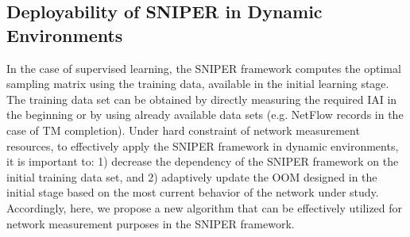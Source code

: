 %
%

\subsection{Deployability of SNIPER in Dynamic Environments}
In the case of supervised learning, the SNIPER framework computes the optimal sampling matrix using the training data, available in the initial learning stage. The training data set can be obtained by directly measuring the required IAI in the beginning or by using already available data sets (e.g. NetFlow records in the case of TM completion). Under hard constraint of network measurement resources, to effectively apply the SNIPER framework in dynamic environments, it is important to: 1) decrease the dependency of the SNIPER framework on the initial training data set, and 2) adaptively update the OOM designed in the initial stage based on the most current behavior of the network under study. Accordingly, here, we propose a new algorithm that can be effectively utilized for network measurement purposes in the SNIPER framework. 

